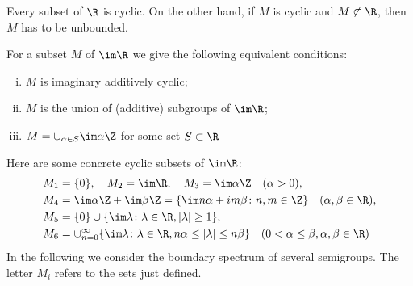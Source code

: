 	Every subset of $\R$ is cyclic. On the other hand, if $M$ is cyclic and $M \not\subset \R$, then $M$ has to be unbounded.
	
	For a subset $M$ of $\im \R$ we give the following equivalent conditions:
	\begin{enumerate}[(i)]
		\item 
		$M$ is imaginary additively cyclic;
		
		\item 
		$M$ is the union of (additive) subgroups of $\im \R$;
		
		\item 
		$M = \cup_{\alpha \in S} \im\alpha\Z$ for some set $S \subset \R$
	\end{enumerate}
	
	Here are some concrete cyclic subsets of $\im \R$:
	\begin{align*}
		M_{1} &= \{0\}, \quad M_{2} = \im\R, \quad M_{3} = \im\alpha\Z \quad (\alpha > 0), \\
		M_{4} &= \im\alpha\Z + \im\beta\Z = \{\im n\alpha + im\beta \colon n,m \in \Z\} \quad (\alpha, \beta \in \R), \\
		M_{5} &= \{0\} \cup \{\im \lambda \colon \lambda \in \R, |\lambda| \geq 1\}, \\
		M_{6} &= \cup_{n=0}^{\infty}\{\im \lambda \colon \lambda \in \R, n\alpha \leq |\lambda| \leq n\beta\} \quad (0 < \alpha \leq \beta, \alpha,\beta \in \R)
	\end{align*}
	In the following we consider the boundary spectrum of several semigroups. The letter $M_{i}$ refers to the sets just defined.
